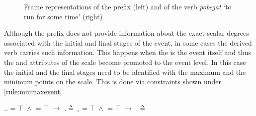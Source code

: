 \begin{figure}
\begin{minipage}{0.4\textwidth}
\end{minipage}
\begin{minipage}{0.55\textwidth}
\end{minipage}
\caption{Frame representations of the prefix  (left) and of the verb \textit{pobegat} `to run for some time' (right) \label{frame:po:delim}}
\end{figure}

Although the prefix does not provide information about the exact scalar degrees associated with the initial and final stages of the event, in some cases the derived verb carries such information. This happens when the  is the event itself and thus the \MIN and \MAX attributes of the scale become promoted to the event level. In this case the initial and the final stages need to be identified with the maximum and the minimum points on the scale. This is done via constraints shown under \ref{rule:minmaxevent}.

\ex.\label{rule:minmaxevent}\a. \MIN = $\top$ $\,\wedge\,$ \INIT = $\top$ $\rightarrow$ \INIT.\POS $\triangleq$ \MIN
\b. \MAX = $\top$ $\,\wedge\,$ \FIN = $\top$ $\rightarrow$ \FIN.\POS $\triangleq$ \MAX

